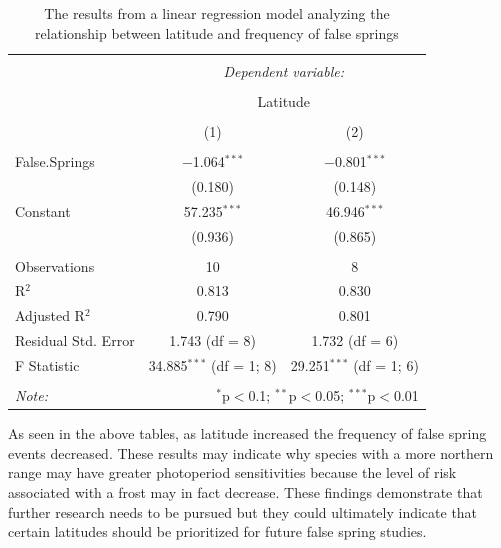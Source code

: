 \documentclass{article}\usepackage[]{graphicx}\usepackage[]{color}
\begin{document}
\begin{table}[!htbp] \centering 
  \caption{The results from a linear regression model analyzing the relationship between latitude and frequency of false springs} 
  \label{} 
\begin{tabular}{@{\extracolsep{5pt}}lcc} 
\\[-1.8ex]\hline 
\hline \\[-1.8ex] 
 & \multicolumn{2}{c}{\textit{Dependent variable:}} \\ 
\cline{2-3} 
\\[-1.8ex] & \multicolumn{2}{c}{Latitude} \\ 
\\[-1.8ex] & (1) & (2)\\ 
\hline \\[-1.8ex] 
 False.Springs & $-$1.064$^{***}$ & $-$0.801$^{***}$ \\ 
  & (0.180) & (0.148) \\ 
  Constant & 57.235$^{***}$ & 46.946$^{***}$ \\ 
  & (0.936) & (0.865) \\ 
 \hline \\[-1.8ex] 
Observations & 10 & 8 \\ 
R$^{2}$ & 0.813 & 0.830 \\ 
Adjusted R$^{2}$ & 0.790 & 0.801 \\ 
Residual Std. Error & 1.743 (df = 8) & 1.732 (df = 6) \\ 
F Statistic & 34.885$^{***}$ (df = 1; 8) & 29.251$^{***}$ (df = 1; 6) \\ 
\hline 
\hline \\[-1.8ex] 
\textit{Note:}  & \multicolumn{2}{r}{$^{*}$p$<$0.1; $^{**}$p$<$0.05; $^{***}$p$<$0.01} \\ 
\end{tabular} 
\end{table} 


As seen in the above tables, as latitude increased the frequency of false spring events decreased. These results may indicate why species with a more northern range may have greater photoperiod sensitivities \citep{Caffarra2011} because the level of risk associated with a frost may in fact decrease. These findings demonstrate that further research needs to be pursued but they could ultimately indicate that certain latitudes should be prioritized for future false spring studies. 
\end{document}
